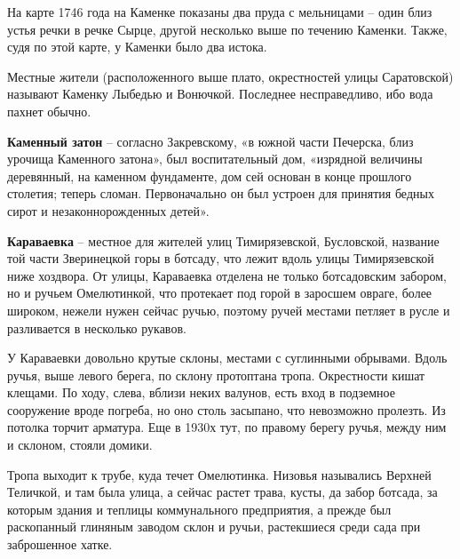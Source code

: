 
На карте 1746 года на Каменке показаны два пруда с мельницами – один близ устья речки в речке Сырце, другой несколько выше по течению Каменки. Также, судя по этой карте, у Каменки было два истока.

Местные жители (расположенного выше плато, окрестностей улицы Саратовской) называют Каменку Лыбедью и Вонючкой. Последнее несправедливо, ибо вода пахнет обычно.\\

\medskip

\textbf{Каменный затон} – согласно Закревскому, «в южной части Печерска, близ урочища Каменного затона», был воспитательный дом, «изрядной величины деревянный, на каменном фундаменте, дом сей основан в конце прошлого столетия; теперь сломан. Первоначально он был устроен для принятия бедных сирот и незаконнорожденных детей».\\


\medskip

\textbf{Караваевка} – местное для жителей улиц Тимирязевской, Бусловской, название той части Зверинецкой горы в ботсаду, что лежит вдоль улицы Тимирязевской ниже хоздвора. От улицы, Караваевка отделена не только ботсадовским забором, но и ручьем Омелютинкой, что протекает под горой в заросшем овраге, более широком, нежели нужен сейчас ручью, поэтому ручей местами петляет в русле и разливается в несколько рукавов.

У Караваевки довольно крутые склоны, местами с суглинными обрывами. Вдоль ручья, выше левого берега, по склону протоптана тропа. Окрестности кишат клещами. По ходу, слева, вблизи неких валунов, есть вход в подземное сооружение вроде погреба, но оно столь засыпано, что невозможно пролезть. Из потолка торчит арматура. Еще в 1930х тут, по правому берегу ручья, между ним и склоном, стояли домики.

Тропа выходит к трубе, куда течет Омелютинка. Низовья назывались Верхней Теличкой, и там была улица, а сейчас растет трава, кусты, да забор ботсада, за которым здания и теплицы коммунального предприятия, а прежде был раскопанный глиняным заводом склон и ручьи, растекшиеся среди сада при заброшенное хатке. 

